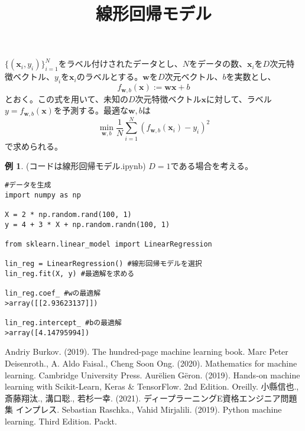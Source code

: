 \documentclass{jsarticle}
\theoremstyle{definition}
\newtheorem{ex}{例}[section]
\begin{document}
\title{線形回帰モデル}
\date{}
\maketitle
$\{(\mathbf{x}_{i},y_{i})\}_{i=1}^{N}$をラベル付けされたデータとし、$N$をデータの数、$\mathbf{x}_{i}$を$D$次元特徴ベクトル、$y_{i}$を$\mathbf{x}_{i}$のラベルとする。$\mathbf{w}$を$D$次元ベクトル、$b$を実数とし、
\begin{equation*}
f_{\mathbf{w},b}(\mathbf{x}):=\mathbf{w}\mathbf{x}+b
\end{equation*}
とおく。この式を用いて、未知の$D$次元特徴ベクトル$\mathbf{x}$に対して、ラベル$y=f_{\mathbf{w},b}(\mathbf{x})$を予測する。最適な$\mathbf{w},b$は
\begin{equation*}
\min_{\mathbf{w},b}\frac{1}{N}\sum_{i=1}^{N}(f_{\mathbf{w},b}(\mathbf{x}_{i})-y_{i})^{2}
\end{equation*}
で求められる。
\begin{ex} (コードは線形回帰モデル.ipynb) $D=1$である場合を考える。
\begin{verbatim}
#データを生成
import numpy as np

X = 2 * np.random.rand(100, 1) 
y = 4 + 3 * X + np.random.randn(100, 1)

from sklearn.linear_model import LinearRegression

lin_reg = LinearRegression() #線形回帰モデルを選択
lin_reg.fit(X, y) #最適解を求める

lin_reg.coef_ #wの最適解
>array([[2.93623137]])

lin_reg.intercept_ #bの最適解
>array([4.14795994])
\end{verbatim}
\end{ex}
\begin{thebibliography}{99}
 Andriy Burkov. (2019). The hundred-page machine learning book.
 Marc Peter Deisenroth., A. Aldo Faisal., Cheng Soon Ong. (2020). Mathematics for machine learning. Cambridge University Press.
 Aur\"{e}lien G\"{e}ron. (2019). Hands-on machine learning with Scikit-Learn, Keras \&  TensorFlow. 2nd Edition. Oreilly.
 小縣信也., 斎藤翔汰., 溝口聡., 若杉一幸. (2021). ディープラーニングE資格エンジニア問題集 インプレス.
 Sebastian Raschka., Vahid Mirjalili. (2019). Python machine learning. Third Edition. Packt.

\end{thebibliography}
\end{document}
